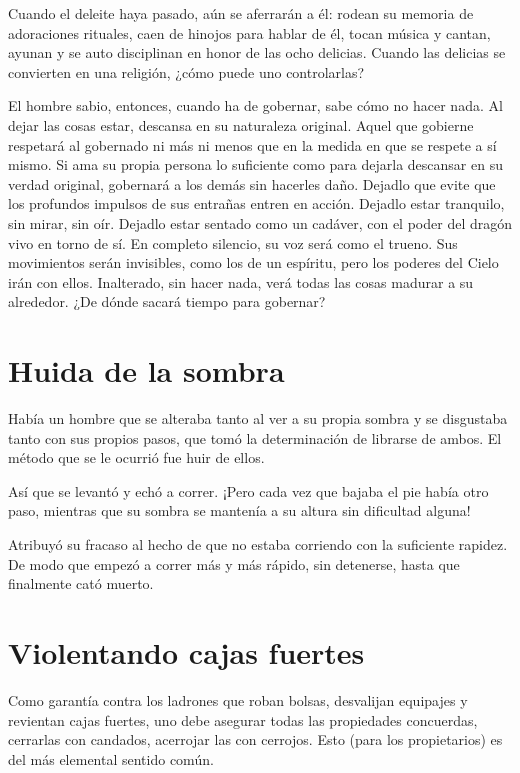 \documentclass[hidelinks]{memoir}
\begin{document}
	Cuando el deleite haya pasado, aún se aferrarán a él: rodean su memoria
	de adoraciones rituales, caen de hinojos para hablar de él, tocan música
	y cantan, ayunan y se auto disciplinan en honor de las ocho delicias.
	Cuando las delicias se convierten en una religión, ¿cómo puede uno
	controlarlas?
	
	El hombre sabio, entonces, cuando ha de gobernar, sabe cómo no hacer
	nada. Al dejar las cosas estar, descansa en su naturaleza original.
	Aquel que gobierne respetará al gobernado ni más ni menos que en la
	medida en que se respete a sí mismo. Si ama su propia persona lo
	suficiente como para dejarla descansar en su verdad original, gobernará
	a los demás sin hacerles daño. Dejadlo que evite que los profundos
	impulsos de sus entrañas entren en acción. Dejadlo estar tranquilo, sin
	mirar, sin oír. Dejadlo estar sentado como un cadáver, con el poder del
	dragón vivo en torno de sí. En completo silencio, su voz será como el
	trueno. Sus movimientos serán invisibles, como los de un espíritu, pero
	los poderes del Cielo irán con ellos. Inalterado, sin hacer nada, verá
	todas las cosas madurar a su alrededor. ¿De dónde sacará tiempo para
	gobernar?
	
	\chapter*{Huida de la sombra}
	
	Había un hombre que se alteraba tanto al ver a su propia sombra y se
	disgustaba tanto con sus propios pasos, que tomó la determinación de
	librarse de ambos. El método que se le ocurrió fue huir de ellos.
	
	Así que se levantó y echó a correr. ¡Pero cada vez que bajaba el pie
	había otro paso, mientras que su sombra se mantenía a su altura sin
	dificultad alguna!
	
	Atribuyó su fracaso al hecho de que no estaba corriendo con la
	suficiente rapidez. De modo que empezó a correr más y más rápido, sin
	detenerse, hasta que finalmente cató muerto.
	
	\chapter*{Violentando cajas fuertes}
	
	Como garantía contra los ladrones que roban bolsas, desvalijan equipajes
	y revientan cajas fuertes, uno debe asegurar todas las propiedades
	concuerdas, cerrarlas con candados, acerrojar las con cerrojos. Esto
	(para los propietarios) es del más elemental sentido común.
	
\end{document}
